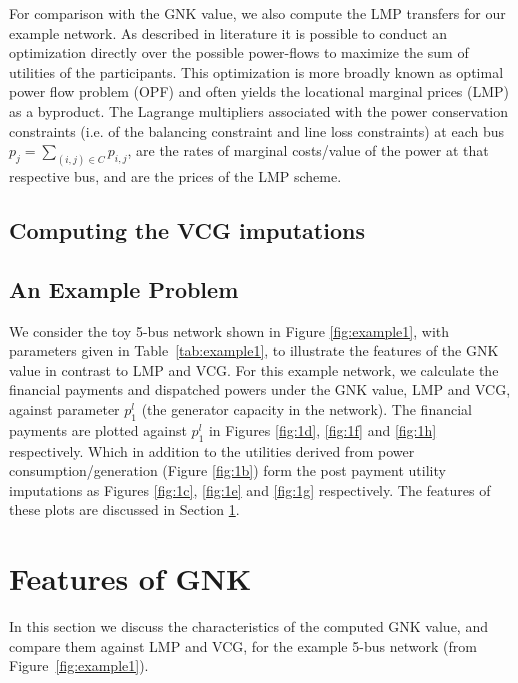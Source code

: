 For comparison with the GNK value, we also compute the LMP transfers for our example network.
As described in literature \cite{lmp1,lmp2} it is possible to conduct an optimization directly over the possible power-flows to maximize the sum of utilities of the participants.
This optimization is more broadly known as optimal power flow problem (OPF) and often yields the locational marginal prices (LMP) as a byproduct.
The Lagrange multipliers associated with the power conservation constraints (i.e. of the balancing constraint and line loss constraints) at each bus $p_j = \sum_{(i,j)\in C}p_{i,j}$, are the rates of marginal costs/value of the power at that respective bus, and are the prices of the LMP scheme.



\subsection{Computing the VCG imputations}



\subsection{An Example Problem}\label{sec:example_network}

We consider the toy 5-bus network shown in Figure \ref{fig:example1}, with parameters given in Table~\ref{tab:example1}, to illustrate the features of the GNK value in contrast to LMP and VCG.
For this example network, we calculate the financial payments and dispatched powers under the GNK value, LMP and VCG, against parameter $p_1^l$ (the generator capacity in the network).
The financial payments are plotted against $p_1^l$ in Figures \ref{fig:1d}, \ref{fig:1f} and \ref{fig:1h} respectively. Which in addition to the utilities derived from power consumption/generation (Figure \ref{fig:1b}) form the post payment utility imputations as Figures \ref{fig:1c}, \ref{fig:1e} and \ref{fig:1g} respectively. The features of these plots are discussed in Section \ref{sec:features}.


\section{Features of GNK}\label{sec:features}

In this section we discuss the characteristics of the computed GNK value, and compare them against LMP and VCG, for the example 5-bus network (from Figure~\ref{fig:example1}).

